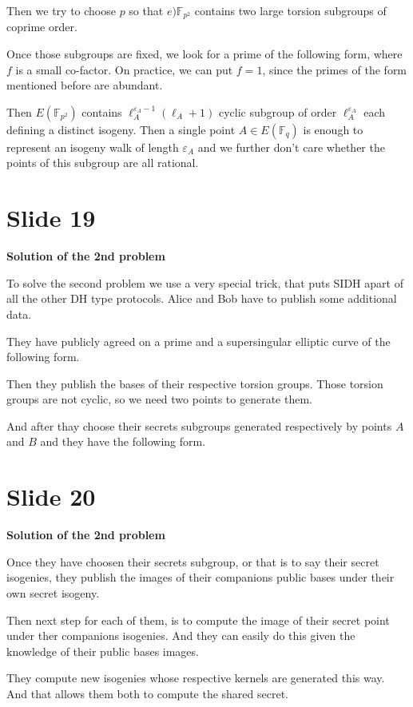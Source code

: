 \documentclass[10 pt]{article}
\begin{document}
{Then we try to choose $p$ so that $e)\mathbb{F}_{p^2}$ contains two large torsion subgroups of coprime order.

Once those subgroups are fixed, we look for a prime of the following form, where $f$ is a small co-factor. On practice, we can put $f = 1$, since the primes of the form mentioned before are abundant.

Then $E(\mathbb{F}_{p^2})$ contains $\ell_A^{\varepsilon_A-1}(\ell_A + 1)$ cyclic subgroup of order $\ell_A^{\varepsilon_A}$ each defining a distinct isogeny. Then a single point $A \in E(\mathbb{F}_q)$ is enough to represent an isogeny walk of length $\varepsilon_A$ and we further don't care whether the points of this subgroup are all rational.

\section{Slide 19} \large{\textbf{Solution of the 2nd problem}}

To solve the second problem we use a very special trick, that puts SIDH apart of  all the other DH type protocols. Alice and Bob have to publish some additional data.

They have publicly agreed on a prime and a supersingular elliptic curve of the following form.

Then they publish the bases of their respective torsion groups. Those torsion groups are not cyclic, so we need two points to generate them.

And after thay choose their secrets subgroups generated respectively by points $A$ and $B$ and they have the following form.

\section{Slide 20} \large{\textbf{Solution of the 2nd problem}}

Once they have choosen their secrets subgroup, or that is to say their secret isogenies, they publish the images of their companions public bases under their own secret isogeny.

Then next step for each of them, is to compute the image of their secret point under ther companions isogenies. And they can easily do this given the knowledge of their public bases images.

They compute new isogenies whose respective kernels are generated this way. And that allows them both to compute the shared secret.

}
\end{document}
